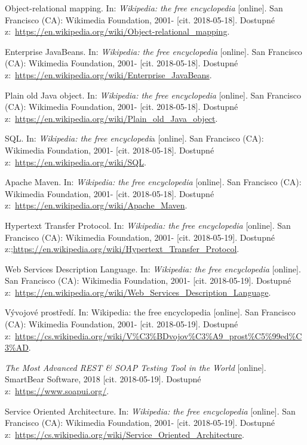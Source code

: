 \documentclass[a4paper,12pt]{article}
\begin{document}
{  Object-relational mapping. In: \textit{Wikipedia: the free encyclopedia} [online]. San Francisco (CA): Wikimedia Foundation, 2001- [cit. 2018-05-18]. Dostupné z:~\url{https://en.wikipedia.org/wiki/Object-relational_mapping}.
  
  Enterprise JavaBeans. In: \textit{Wikipedia: the free encyclopedia} [online]. San Francisco (CA): Wikimedia Foundation, 2001- [cit. 2018-05-18]. Dostupné z:~\url{https://en.wikipedia.org/wiki/Enterprise_JavaBeans}.
  
  Plain old Java object. In: \textit{Wikipedia: the free encyclopedia} [online]. San Francisco (CA): Wikimedia Foundation, 2001- [cit. 2018-05-18]. Dostupné z:~\url{https://en.wikipedia.org/wiki/Plain_old_Java_object}.
  
  SQL. In: \textit{Wikipedia: the free encyclopedi}a [online]. San Francisco (CA): Wikimedia Foundation, 2001- [cit. 2018-05-18]. Dostupné z:~\url{https://en.wikipedia.org/wiki/SQL}.
  
  Apache Maven. In: \textit{Wikipedia: the free encyclopedia} [online]. San Francisco (CA): Wikimedia Foundation, 2001- [cit. 2018-05-18]. Dostupné z:~\url{https://en.wikipedia.org/wiki/Apache_Maven}.
  
  Hypertext Transfer Protocol. In: \textit{Wikipedia: the free encyclopedia} [online]. San Francisco (CA): Wikimedia Foundation, 2001- [cit. 2018-05-19]. Dostupné z:;\url{https://en.wikipedia.org/wiki/Hypertext_Transfer_Protocol}.
  
  Web Services Description Language. In: \textit{Wikipedia: the free encyclopedia} [online]. San Francisco (CA): Wikimedia Foundation, 2001- [cit. 2018-05-19]. Dostupné z:~\url{https://en.wikipedia.org/wiki/Web_Services_Description_Language}.
  
  Vývojové prostředí. In: Wikipedia: the free encyclopedia [online]. San Francisco (CA): Wikimedia Foundation, 2001- [cit. 2018-05-19]. Dostupné z:~\url{https://cs.wikipedia.org/wiki/V\%C3\%BDvojov\%C3\%A9_prost\%C5\%99ed\%C3\%AD}.
 
  \textit{The Most Advanced REST \& SOAP Testing Tool in the World} [online]. SmartBear Software, 2018 [cit. 2018-05-19]. Dostupné z:~\url{https://www.soapui.org/}.
 
  Service Oriented Architecture. In: \textit{Wikipedia: the free encyclopedia} [online]. San Francisco (CA): Wikimedia Foundation, 2001- [cit. 2018-05-19]. Dostupné z:~\url{https://cs.wikipedia.org/wiki/Service_Oriented_Architecture}.
  
}
\end{document}
